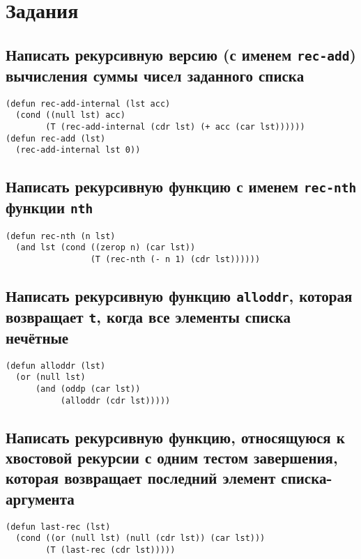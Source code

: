 \chapter{Задания}

\section{Написать рекурсивную версию (с именем \texttt{rec-add}) вычисления суммы чисел заданного списка}

\begin{lstlisting}
(defun rec-add-internal (lst acc)
  (cond ((null lst) acc)
        (T (rec-add-internal (cdr lst) (+ acc (car lst))))))
(defun rec-add (lst)
  (rec-add-internal lst 0))
\end{lstlisting}

\section{Написать рекурсивную функцию с именем \texttt{rec-nth} функции \texttt{nth}}

\begin{lstlisting}
(defun rec-nth (n lst)
  (and lst (cond ((zerop n) (car lst))
                 (T (rec-nth (- n 1) (cdr lst))))))
\end{lstlisting}

\section{Написать рекурсивную функцию \texttt{alloddr}, которая возвращает \texttt{t}, когда все элементы списка нечётные}

\begin{lstlisting}
(defun alloddr (lst)
  (or (null lst) 
      (and (oddp (car lst))
           (alloddr (cdr lst)))))
\end{lstlisting}

\section{Написать рекурсивную функцию, относящуюся к хвостовой рекурсии с одним тестом завершения, которая возвращает последний элемент списка-аргумента}

\begin{lstlisting}
(defun last-rec (lst)
  (cond ((or (null lst) (null (cdr lst)) (car lst)))
        (T (last-rec (cdr lst)))))
\end{lstlisting}

